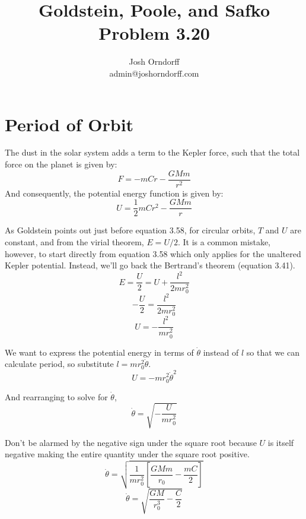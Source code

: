 \documentclass[10pt,a4paper]{article}
\begin{document}
\title{Goldstein, Poole, and Safko Problem 3.20}
\author{Josh Orndorff \\ admin@joshorndorff.com}
\maketitle

\section{Period of Orbit}
The dust in the solar system adds a term to the Kepler force, such that the total force on the planet is given by:
\begin{equation}
F=-mCr-\frac{GMm}{r^2}
\end{equation}
And consequently, the potential energy function is given by:
\begin{equation}
U=\frac{1}{2}mCr^2-\frac{GMm}{r}
\end{equation}

As Goldstein points out just before equation 3.58, for circular orbits, $T$ and $U$ are constant, and from the virial theorem, $E=U/2$.  It is a common mistake, however, to start directly from equation 3.58 which only applies for the unaltered Kepler potential. Instead, we'll go back the Bertrand's theorem (equation 3.41).
\begin{equation}
E=\frac{U}{2}=U+\frac{l^2}{2mr_0^2}
\end{equation}
\begin{equation}
-\frac{U}{2}=\frac{l^2}{2mr_0^2}
\end{equation}
\begin{equation}
U=-\frac{l^2}{mr_0^2}
\end{equation}

We want to express the potential energy in terms of $\dot{\theta}$ instead of $l$ so that we can calculate period, so substitute $l=mr_0^2\dot{\theta}$.
\begin{equation}
U=-mr_0^2\dot{\theta}^2
\end{equation}

And rearranging to solve for $\dot{\theta}$,
\begin{equation}
\dot{\theta}=\sqrt{-\frac{U}{mr_0^2}}
\end{equation}

Don't be alarmed by the negative sign under the square root because $U$ is itself negative making the entire quantity under the square root positive.
\begin{equation}
\dot{\theta}=\sqrt{\frac{1}{mr_0^2}\left[\frac{GMm}{r_0}-\frac{mC}{2}\right]}
\end{equation}
\begin{equation}
\dot{\theta}=\sqrt{\frac{GM}{r_0^3}-\frac{C}{2}}
\end{equation}
\end{document}
